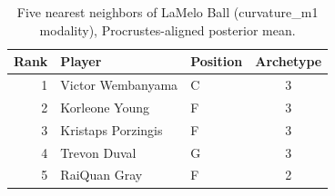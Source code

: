 \begin{table}[htbp]
  \centering\small
  \begin{tabular}{rllc}
    \toprule
    Rank & Player & Position & Archetype \\
    \midrule
    1 & Victor Wembanyama & C & 3 \\
    2 & Korleone Young & F & 3 \\
    3 & Kristaps Porzingis & F & 3 \\
    4 & Trevon Duval & G & 3 \\
    5 & RaiQuan Gray & F & 2 \\
    \bottomrule
  \end{tabular}
  \caption{Five nearest neighbors of LaMelo Ball (curvature_m1 modality), Procrustes-aligned posterior mean.}
  \label{tab:LaMelo_Ball_neighbors_curvature_m1}
\end{table}

